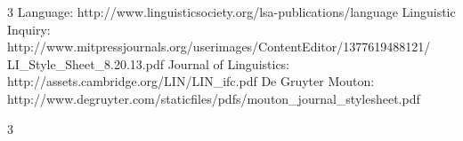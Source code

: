  	
 	
 	
 	
 	
 	
 	
 	
 	
 	
 	
 	
 	
 	
 	
 	
 	
 	
 	
 	
 	
 	
 	
 	
 	
 	
 	
 	
 	
 	
 	
 	
 	
 	
 	
 	
 	
 	
 	
 	
 	
 	
 	
 	
 	
 	
 	
 	
 	
 	
 	
 	
 	
 	
	
 
3
 Language:
 http://www.linguisticsociety.org/lsa-publications/language
Linguistic Inquiry:
 http://www.mitpressjournals.org/userimages/ContentEditor/1377619488121/
LI\_Style\_Sheet\_8.20.13.pdf
Journal of Linguistics:
 http://assets.cambridge.org/LIN/LIN\_ifc.pdf
De Gruyter Mouton:
 http://www.degruyter.com/staticfiles/pdfs/mouton\_journal\_stylesheet.pdf
	
 
 3	
  

